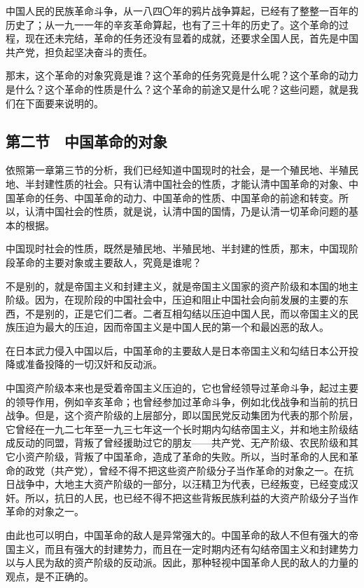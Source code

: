 中国人民的民族革命斗争，从一八四〇年的鸦片战争算起，已经有了整整一百年的历史了；从一九一一年的辛亥革命算起，也有了三十年的历史了。这个革命的过程，现在还未完结，革命的任务还没有显着的成就，还要求全国人民，首先是中国共产党，担负起坚决奋斗的责任。

那末，这个革命的对象究竟是谁？这个革命的任务究竟是什么呢？这个革命的动力是什么？这个革命的性质是什么？这个革命的前途又是什么呢？这些问题，就是我们在下面要来说明的。

\subsection{第二节　中国革命的对象}

依照第一章第三节的分析，我们已经知道中国现时的社会，是一个殖民地、半殖民地、半封建性质的社会。只有认清中国社会的性质，才能认清中国革命的对象、中国革命的任务、中国革命的动力、中国革命的性质、中国革命的前途和转变。所以，认清中国社会的性质，就是说，认清中国的国情，乃是认清一切革命问题的基本的根据。

中国现时社会的性质，既然是殖民地、半殖民地、半封建的性质，那末，中国现阶段革命的主要对象或主要敌人，究竟是谁呢？

不是别的，就是帝国主义和封建主义，就是帝国主义国家的资产阶级和本国的地主阶级。因为，在现阶段的中国社会中，压迫和阻止中国社会向前发展的主要的东西，不是别的，正是它们二者。二者互相勾结以压迫中国人民，而以帝国主义的民族压迫为最大的压迫，因而帝国主义是中国人民的第一个和最凶恶的敌人。

在日本武力侵入中国以后，中国革命的主要敌人是日本帝国主义和勾结日本公开投降或准备投降的一切汉奸和反动派。

中国资产阶级本来也是受着帝国主义压迫的，它也曾经领导过革命斗争，起过主要的领导作用，例如辛亥革命；也曾经参加过革命斗争，例如北伐战争和当前的抗日战争。但是，这个资产阶级的上层部分，即以国民党反动集团为代表的那个阶层，它曾经在一九二七年至一九三七年这一个长时期内勾结帝国主义，并和地主阶级结成反动的同盟，背叛了曾经援助过它的朋友——共产党、无产阶级、农民阶级和其它小资产阶级，背叛了中国革命，造成了革命的失败。所以，当时革命的人民和革命的政党（共产党），曾经不得不把这些资产阶级分子当作革命的对象之一。在抗日战争中，大地主大资产阶级的一部分，以汪精卫为代表，已经叛变，已经变成汉奸。所以，抗日的人民，也已经不得不把这些背叛民族利益的大资产阶级分子当作革命的对象之一。

由此也可以明白，中国革命的敌人是异常强大的。中国革命的敌人不但有强大的帝国主义，而且有强大的封建势力，而且在一定时期内还有勾结帝国主义和封建势力以与人民为敌的资产阶级的反动派。因此，那种轻视中国革命人民的敌人的力量的观点，是不正确的。

